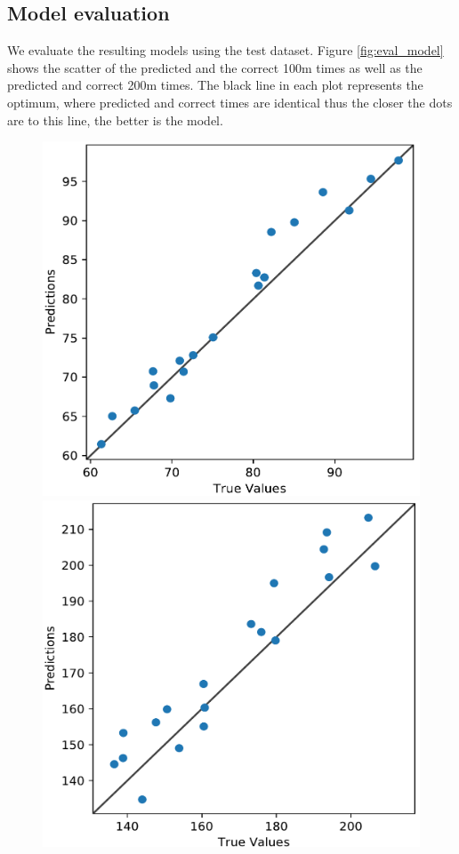 \subsection{Model evaluation}
We evaluate the resulting models using the test dataset. Figure \ref{fig:eval_model} shows the scatter of the predicted and the correct 100m times as well as the predicted and correct 200m times. The black line in each plot represents the optimum, where predicted and correct times are identical thus the closer the dots are to this line, the better is the model.
\begin{figure}[ht]
    \begin{minipage}{0.23\textwidth}
    \includegraphics[width=\textwidth]{visualisation/eval_100m.png}
\end{minipage}
\begin{minipage}{0.23\textwidth}
    \includegraphics[width=\textwidth]{visualisation/eval_200m.png}

\end{minipage}
\end{figure}
